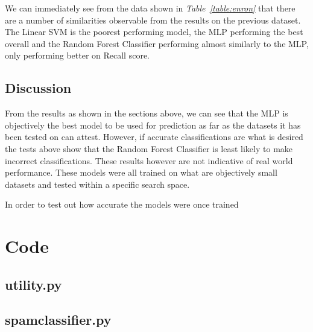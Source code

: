 \documentclass[11pt, a4paper]{article}
\begin{document}
We can immediately see from the data shown in \emph{Table~\ref{table:enron}} that there are a number of similarities observable from the results on the previous dataset. The Linear SVM is the poorest performing model, the MLP performing the best overall and the Random Forest Classifier performing almost similarly to the MLP, only performing better on Recall score.

\subsection{Discussion}

From the results as shown in the sections above, we can see that the MLP is objectively the best model to be used for prediction as far as the datasets it has been tested on can attest. However, if accurate classifications are what is desired the tests above show that the Random Forest Classifier is least likely to make incorrect classifications. These results however are not indicative of real world performance. These models were all trained on what are objectively small datasets and tested within a specific search space. 

In order to test out how accurate the models were once trained 

\newpage


\newpage

\appendix


\section{Code}

\subsection{utility.py}

\newpage
\subsection{spam\textunderscore classifier.py}

\end{document}
